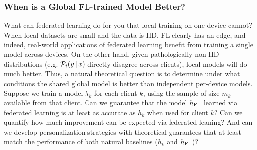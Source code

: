\subsubsection{When is a Global FL-trained Model Better?}
What can federated learning do for you that local training on one device cannot? When local datasets are small and the data is IID, FL clearly has an edge, and indeed, real-world applications of federated learning \cite{yang18gboardquery, hard18gboard, chen19oov} benefit from training a single model across devices. On the other hand, given pathologically non-IID distributions (e.g. $\mathcal{P}_i(y \,|\, x)$ directly disagree across clients), local models will do much better. Thus, a natural theoretical question is to determine under what conditions the shared global model is better than independent per-device models. Suppose we train a model $h_k$ for each client $k$, using the sample of size $m_k$ available from that client. Can we guarantee that the model $h_{\text{FL}}$ learned via federated learning is at least as accurate as $h_k$ when used for client $k$?
Can we quantify how much improvement can be expected via federated leaning?
And can we develop personalization strategies with theoretical guarantees that at least match the performance of both natural baselines ($h_k$ and $h_{\text{FL}}$)?

